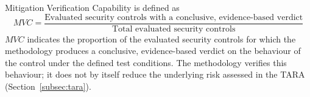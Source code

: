 Mitigation Verification Capability is defined as
\begin{equation}
	MVC = \frac{\text{Evaluated security controls with a conclusive, evidence-based verdict}}{\text{Total evaluated security controls}}
\end{equation}
$MVC$ indicates the proportion of the evaluated security controls for which the methodology produces a conclusive, evidence-based verdict on the behaviour of the control under the defined test conditions. The methodology verifies this behaviour; it does not by itself reduce the underlying risk assessed in the TARA (Section~\ref{subsec:tara}).


